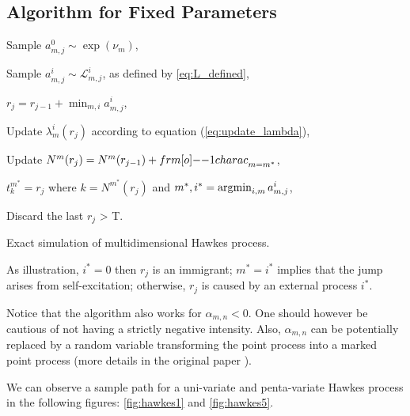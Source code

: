 \subsection{Algorithm for Fixed Parameters}



\begin{algorithm}[H]
\label{algo:simul_hp}
\SetAlgoLined

			{ 
					{
						{Sample $a_{m,j}^0 \sim \exp( \nu_m ) $,
						
							{Sample $a_{m,j}^i \sim  \mathcal L^i_{m,j} $, as defined by \ref{eq:L_defined},
							}
						}
						
						$r_j = r_{j-1} + \min_{m,i} a_{m,j}^i$,
						
							{Update $\lambda_m^i ( r_j )$ according to equation (\ref{eq:update_lambda}),
							
							Update $N^m ( r_j ) = N^m( r_{j-1} ) + {\11charac}_{m = m^*} $,}
					$t_k^{m^*} = r_j$ where $k = N^{m^*} ( r_j ) $ and $ m^*,i^* = \operatorname*{\arg\!\min}_{i,m} a_{m,j}^i $,
					}
			Discard the last $r_j$ > T.
			}
\caption{Exact simulation of multidimensional Hawkes process.}
\end{algorithm}



\begin{remarque}
As illustration, $i^* = 0$ then $r_j$ is an immigrant; $m^* = i^*$ implies that the jump arises from self-excitation; otherwise, $r_j$ is caused by an external process $i^*$.
\end{remarque}

\begin{remarque}
Notice that the algorithm also works for $\alpha_{m,n} < 0$. One should however be cautious of not having a strictly negative intensity. Also, $\alpha_{m,n}$ can be potentially replaced by a random variable transforming the point process into a marked point process (more details in the original paper \cite{my_algo_simul}).
\end{remarque}

We can observe a sample path for a uni-variate and penta-variate Hawkes process in the following figures: \ref{fig:hawkes1} and \ref{fig:hawkes5}.

